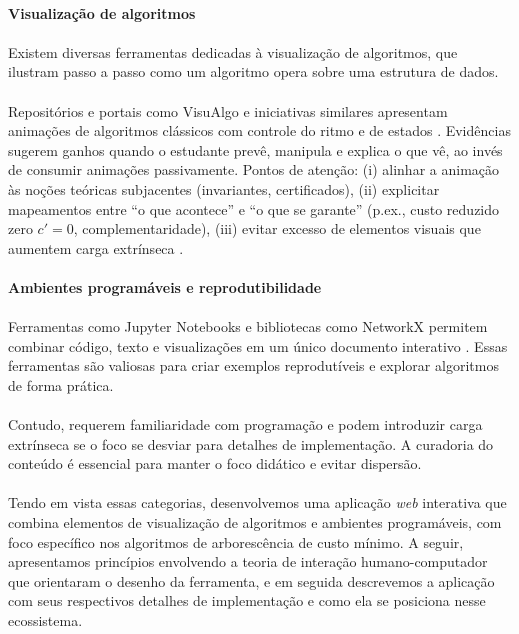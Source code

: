 \documentclass[12pt,a4paper]{article}
\begin{document}
\paragraph{Visualização de algoritmos}
\paragraph{}
Existem diversas ferramentas dedicadas à visualização de algoritmos, que ilustram passo a passo como um algoritmo opera sobre uma estrutura de dados.

\paragraph{}
Repositórios e portais como VisuAlgo e iniciativas similares apresentam animações de algoritmos clássicos com controle do ritmo e de estados \cite{visualgo,hundhausen2002meta,naps2003engagement}. Evidências sugerem ganhos quando o estudante prevê, manipula e explica o que vê, ao invés de consumir animações passivamente. Pontos de atenção: (i) alinhar a animação às noções teóricas subjacentes (invariantes, certificados), (ii) explicitar mapeamentos entre ``o que acontece'' e ``o que se garante'' (p.ex., custo reduzido zero \(c'=0\), complementaridade), (iii) evitar excesso de elementos visuais que aumentem carga extrínseca \cite{mayer2009multimedia}.

\paragraph{Ambientes programáveis e reprodutibilidade}
\paragraph{}
Ferramentas como Jupyter Notebooks e bibliotecas como NetworkX permitem combinar código, texto e visualizações em um único documento interativo \cite{kluyver2016jupyter,hagberg2008networkx}. Essas ferramentas são valiosas para criar exemplos reprodutíveis e explorar algoritmos de forma prática.

\paragraph{}
Contudo, requerem familiaridade com programação e podem introduzir carga extrínseca se o foco se desviar para detalhes de implementação. A curadoria do conteúdo é essencial para manter o foco didático e evitar dispersão.

\paragraph{}
Tendo em vista essas categorias, desenvolvemos uma aplicação \textit{web} interativa que combina elementos de visualização de algoritmos e ambientes programáveis, com foco específico nos algoritmos de arborescência de custo mínimo. A seguir, apresentamos princípios envolvendo a teoria de interação humano-computador que orientaram o desenho da ferramenta, e em seguida descrevemos a aplicação com seus respectivos detalhes de implementação e como ela se posiciona nesse ecossistema.
\end{document}
